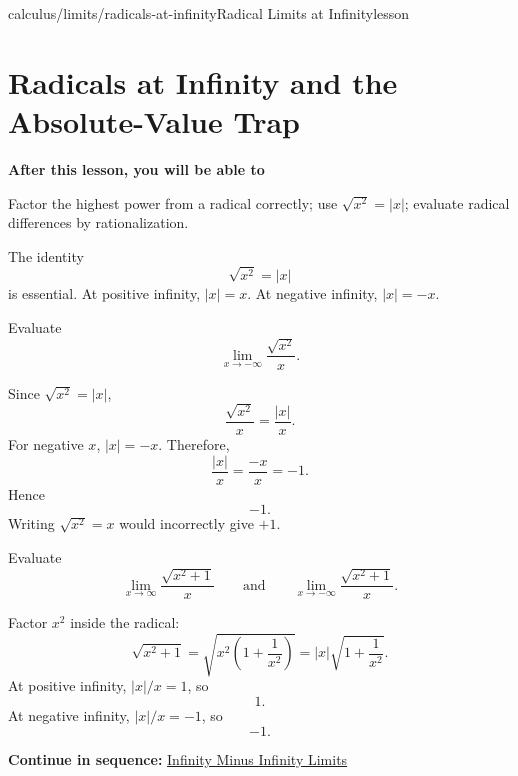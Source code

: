 \documentclass[11pt,openany]{book}
\theoremstyle{bgplain}
\newcounter{bgexample}[chapter]
\newcommand{\webnext}[2]{%
  \par\addvspace{1.2em}\noindent{\color{BGLine}\rule{\textwidth}{0.35pt}}\par\smallskip
  {\small\color{BGGray}\textbf{Continue in sequence:} \hyperlink{web:#1}{#2}}\par
}
\newcommand{\lessonobjective}[1]{%
  \par\Needspace{4\baselineskip}\addvspace{0.6em}%
  {\bfseries\color{BGInk}After this lesson, you will be able to}\par\smallskip
  #1\par\addvspace{0.5em}%
}
\begin{document}
\begin{webpage}{calculus/limits/radicals-at-infinity}{Radical Limits at Infinity}{lesson}
\section{Radicals at Infinity and the Absolute-Value Trap}

\lessonobjective{
Factor the highest power from a radical correctly; use \(\sqrt{x^2}=|x|\); evaluate radical differences by rationalization.
}

The identity
\[
  \boxed{\sqrt{x^2}=|x|}
\]
is essential. At positive infinity, \(|x|=x\). At negative infinity, \(|x|=-x\).

\begin{bgguided}[title={Why the sign changes}]
Evaluate
\[
  \lim_{x\to-\infty}\frac{\sqrt{x^2}}{x}.
\]

\begin{bgsolution}
Since \(\sqrt{x^2}=|x|\),
\[
  \frac{\sqrt{x^2}}{x}=\frac{|x|}{x}.
\]
For negative \(x\), \(|x|=-x\). Therefore,
\[
  \frac{|x|}{x}=\frac{-x}{x}=-1.
\]
Hence
\[
  \boxed{-1}.
\]
Writing \(\sqrt{x^2}=x\) would incorrectly give \(+1\).
\end{bgsolution}
\end{bgguided}

\begin{bgexample}[title={The same radical on two ends}]
Evaluate
\[
  \lim_{x\to\infty}\frac{\sqrt{x^2+1}}{x}
  \qquad\text{and}\qquad
  \lim_{x\to-\infty}\frac{\sqrt{x^2+1}}{x}.
\]

\begin{bgsolution}
Factor \(x^2\) inside the radical:
\[
  \sqrt{x^2+1}=\sqrt{x^2\left(1+\frac1{x^2}\right)}
  =|x|\sqrt{1+\frac1{x^2}}.
\]
At positive infinity, \(|x|/x=1\), so
\[
  \boxed{1}.
\]
At negative infinity, \(|x|/x=-1\), so
\[
  \boxed{-1}.
\]
\end{bgsolution}
\end{bgexample}
\webnext{calculus/limits/infinity-minus-infinity}{Infinity Minus Infinity Limits}
\end{webpage}
\end{document}
